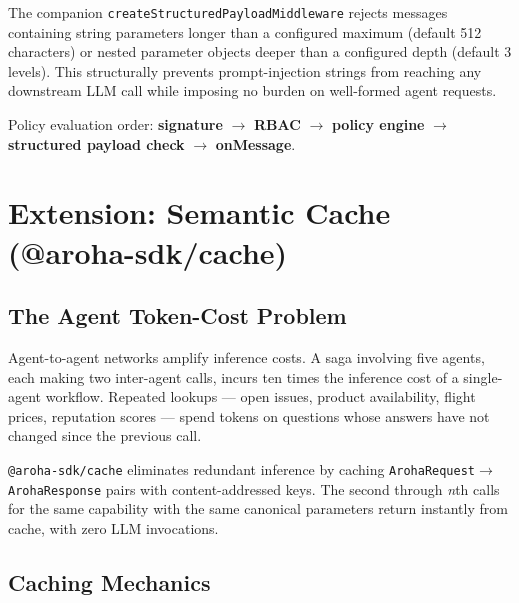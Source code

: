 \documentclass[11pt,a4paper]{article}
\begin{document}
The companion \texttt{createStructuredPayloadMiddleware} rejects messages
containing string parameters longer than a configured maximum (default 512
characters) or nested parameter objects deeper than a configured depth (default 3
levels). This structurally prevents prompt-injection strings from reaching any
downstream LLM call while imposing no burden on well-formed agent requests.

Policy evaluation order: \textbf{signature} $\to$ \textbf{RBAC}
$\to$ \textbf{policy engine} $\to$ \textbf{structured payload check}
$\to$ \textbf{onMessage}.

\section{Extension: Semantic Cache (@aroha-sdk/cache)}

\subsection{The Agent Token-Cost Problem}

Agent-to-agent networks amplify inference costs. A saga involving five agents,
each making two inter-agent calls, incurs ten times the inference cost of a
single-agent workflow. Repeated lookups --- open issues, product availability,
flight prices, reputation scores --- spend tokens on questions whose answers have
not changed since the previous call.

\texttt{@aroha-sdk/cache} eliminates redundant inference by caching
\texttt{ArohaRequest}$\to$\texttt{ArohaResponse} pairs with content-addressed
keys. The second through \textit{n}th calls for the same capability with the
same canonical parameters return instantly from cache, with zero LLM invocations.

\subsection{Caching Mechanics}
\end{document}
